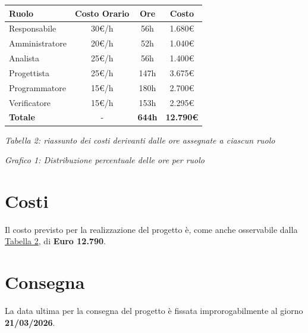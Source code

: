 \documentclass[a4paper,11pt]{article}
\begin{document}
{\footnotesize
\begin{center}
\label{tab:costi-ruoli}
\begin{tabular}{|l|c|c|c|}
\hline
\textbf{Ruolo} & \textbf{Costo Orario} & \textbf{Ore} & \textbf{Costo} \\
\hline
Responsabile & 30€/h & 56h & 1.680€ \\
Amministratore & 20€/h & 52h & 1.040€ \\
Analista & 25€/h & 56h & 1.400€ \\
Progettista & 25€/h & 147h & 3.675€ \\
Programmatore & 15€/h & 180h & 2.700€ \\
Verificatore & 15€/h & 153h & 2.295€ \\
\hline
\textbf{Totale} & - & \textbf{644h} & \textbf{12.790€} \\
\hline
\end{tabular}
\end{center}
}

\begin{center}
\textit{Tabella 2: riassunto dei costi derivanti dalle ore assegnate a ciascun ruolo}
\end{center}

\vspace{1cm}

\begin{center}
\end{center}

\begin{center}
\textit{Grafico 1: Distribuzione percentuale delle ore per ruolo}
\end{center}

\newpage

\section{Costi}
Il costo previsto per la realizzazione del progetto è, come anche osservabile dalla \hyperref[tab:costi-ruoli]{\textcolor{secondaryblue}{Tabella 2}}, di \textbf{Euro 12.790}.

\section{Consegna}
La data ultima per la consegna del progetto è fissata improrogabilmente al giorno \textbf{21/03/2026}.
\end{document}
